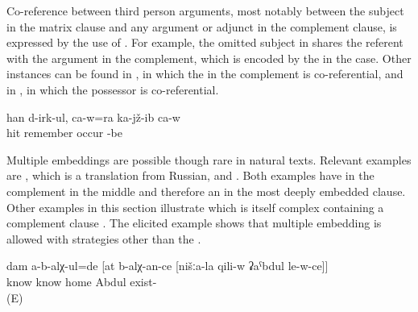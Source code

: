 Co-reference between third person arguments, most notably between the subject in the matrix clause and any argument or adjunct in the complement clause, is expressed by the use of . For example, the omitted subject in  shares the referent with the  argument in the complement, which is encoded by the  in the  case. Other instances can be found in , in which the  in the complement is co-referential, and in , in which the possessor is co-referential.
%
\begin{exe}
	\ex	\label{ex:He is sitting and remembering how (they) beat him up}
	\gll	[cini-j	d-aˁq-ib-te=ra]	han	d-irk-ul,	ca-w=ra	ka-jž-ib	ca-w\\
		 hit	remember	occur		-be	\\
	\glt	{}
\end{exe}

Multiple embeddings are possible though rare in natural texts. Relevant examples are , which is a translation from Russian, and . Both examples have  in the complement in the middle and therefore an  in the most deeply embedded clause. Other examples in this section illustrate  which is itself complex containing a complement clause . The elicited example  shows that multiple embedding is allowed with  strategies other than the .
%
\begin{exe}
	\ex	\label{ex:‎‎‎I did not know that you know that Abdul was at our place}
	\gll	dam	a-b-alχ-ul=de	[at	b-alχ-an-ce	[nišːa-la	qili-w	ʡaˁbdul	le-w-ce]]\\
			know		know		home	Abdul	exist-\\
	\glt	{} (E)
\end{exe}

